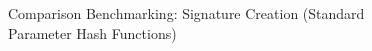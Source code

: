 \documentclass[]{final_report}
\theoremstyle{definition}
\begin{document}
\begin{figure}[H]
    \centering %
    
    \begin{minipage}{0.49\textwidth}
        \centering
        \caption{Comparison Benchmarking: Signature Creation (Standard Parameter Hash Functions)}
        \label{fig:image1}
    \end{minipage}
    \hfill %
    \begin{minipage}{0.49\textwidth}
        \centering

\end{minipage}
\end{figure}
\end{document}
